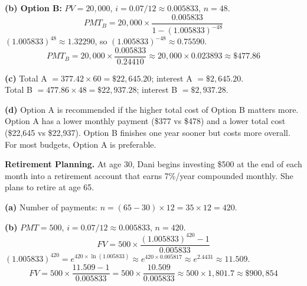 \documentclass[addpoints]{exam}
\begin{document}
\begin{questions}
\begin{solution}
\textbf{(b) Option B:} $PV = 20{,}000$, $i = 0.07/12 \approx 0.005833$, $n = 48$.
\[
PMT_B = 20{,}000 \times \frac{0.005833}{1-(1.005833)^{-48}}
\]
$(1.005833)^{48} \approx 1.32290$, so $(1.005833)^{-48} \approx 0.75590$.
\[
PMT_B = 20{,}000 \times \frac{0.005833}{0.24410} \approx 20{,}000 \times 0.023893 \approx \$477.86
\]

\textbf{(c)}
Total A $= 377.42 \times 60 = \$22{,}645.20$; \quad interest A $= \$2{,}645.20$.\\
Total B $= 477.86 \times 48 = \$22{,}937.28$; \quad interest B $= \$2{,}937.28$.

\textbf{(d)} Option A is recommended if the higher total cost of Option B matters more. Option A has a lower monthly payment (\$377 vs \$478) and a lower total cost (\$22{,}645 vs \$22{,}937). Option B finishes one year sooner but costs more overall. For most budgets, Option A is preferable.
\end{solution}

\vspace{5mm}

\question[8]
\textbf{Retirement Planning.}
At age 30, Dani begins investing \$500 at the end of each month into a retirement account that earns 7\%/year compounded monthly. She plans to retire at age 65.


\begin{solution}
\textbf{(a)} Number of payments: $n = (65 - 30) \times 12 = 35 \times 12 = 420$.

\textbf{(b)}
$PMT = 500$, $i = 0.07/12 \approx 0.005833$, $n = 420$.
\[
FV = 500 \times \frac{(1.005833)^{420} - 1}{0.005833}
\]
$(1.005833)^{420} = e^{420 \times \ln(1.005833)} \approx e^{420 \times 0.005817} \approx e^{2.4431} \approx 11.509$.
\[
FV = 500 \times \frac{11.509 - 1}{0.005833}
   = 500 \times \frac{10.509}{0.005833}
   \approx 500 \times 1{,}801.7
   \approx \$900{,}854
\]


\end{solution}
\end{questions}
\end{document}
